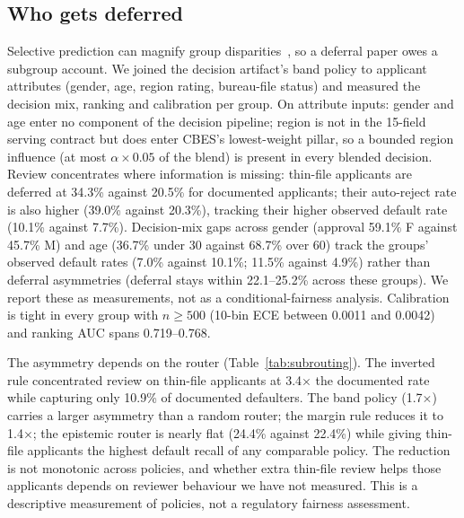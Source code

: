 \documentclass[conference]{IEEEtran}
\begin{document}
\subsection{Who gets deferred}\label{sec:fairness}
Selective prediction can magnify group disparities~\cite{jones2021}, so a
deferral paper owes a subgroup account. We joined the decision artifact's
band policy to applicant attributes (gender, age, region rating,
bureau-file status) and measured the decision mix, ranking and calibration
per group. On attribute inputs: gender and age enter no component of the
decision pipeline; region is not in the 15-field serving contract but does
enter CBES's lowest-weight pillar, so a bounded region influence (at most
$\alpha \times 0.05$ of the blend) is present in every blended decision.
Review concentrates where information is missing: thin-file applicants are
deferred at 34.3\% against 20.5\% for documented applicants; their
auto-reject rate is also higher (39.0\% against 20.3\%), tracking their
higher observed default rate (10.1\% against 7.7\%). Decision-mix gaps
across gender (approval 59.1\% F against 45.7\% M) and age (36.7\% under 30
against 68.7\% over 60) track the groups' observed default rates (7.0\%
against 10.1\%; 11.5\% against 4.9\%) rather than deferral asymmetries
(deferral stays within 22.1--25.2\% across these groups). We report these
as measurements, not as a conditional-fairness analysis. Calibration is
tight in every group with $n \ge 500$ (10-bin ECE between 0.0011 and
0.0042) and ranking AUC spans 0.719--0.768.

The asymmetry depends on the router (Table~\ref{tab:subrouting}). The
inverted rule concentrated review on thin-file applicants at 3.4$\times$
the documented rate while capturing only 10.9\% of documented defaulters.
The band policy (1.7$\times$) carries a larger asymmetry than a random
router; the margin rule reduces it to 1.4$\times$; the epistemic router is
nearly flat (24.4\% against 22.4\%) while giving thin-file applicants the
highest default recall of any comparable policy. The reduction is not
monotonic across policies, and whether extra thin-file review helps those
applicants depends on reviewer behaviour we have not measured. This is a
descriptive measurement of policies, not a regulatory fairness assessment.
\end{document}
